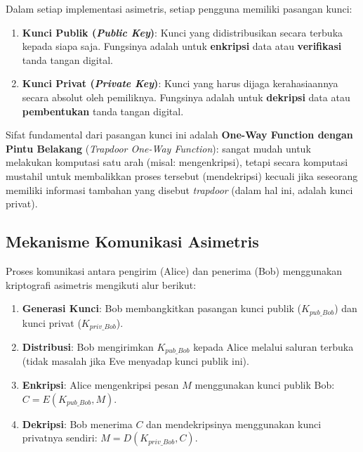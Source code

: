 Dalam setiap implementasi asimetris, setiap pengguna memiliki pasangan kunci:
\begin{enumerate}
    \item \textbf{Kunci Publik (\textit{Public Key})}: Kunci yang didistribusikan secara terbuka kepada siapa saja. Fungsinya adalah untuk \textbf{enkripsi} data atau \textbf{verifikasi} tanda tangan digital.
    \item \textbf{Kunci Privat (\textit{Private Key})}: Kunci yang harus dijaga kerahasiaannya secara absolut oleh pemiliknya. Fungsinya adalah untuk \textbf{dekripsi} data atau \textbf{pembentukan} tanda tangan digital.
\end{enumerate}

Sifat fundamental dari pasangan kunci ini adalah \textbf{One-Way Function dengan Pintu Belakang} (\textit{Trapdoor One-Way Function}): sangat mudah untuk melakukan komputasi satu arah (misal: mengenkripsi), tetapi secara komputasi mustahil untuk membalikkan proses tersebut (mendekripsi) kecuali jika seseorang memiliki informasi tambahan yang disebut \textit{trapdoor} (dalam hal ini, adalah kunci privat).

\subsection{Mekanisme Komunikasi Asimetris}

Proses komunikasi antara pengirim (Alice) dan penerima (Bob) menggunakan kriptografi asimetris mengikuti alur berikut:
\begin{enumerate}
    \item \textbf{Generasi Kunci}: Bob membangkitkan pasangan kunci publik ($K_{pub\_Bob}$) dan kunci privat ($K_{priv\_Bob}$).
    \item \textbf{Distribusi}: Bob mengirimkan $K_{pub\_Bob}$ kepada Alice melalui saluran terbuka (tidak masalah jika Eve menyadap kunci publik ini).
    \item \textbf{Enkripsi}: Alice mengenkripsi pesan $M$ menggunakan kunci publik Bob: $C = E(K_{pub\_Bob}, M)$.
    \item \textbf{Dekripsi}: Bob menerima $C$ dan mendekripsinya menggunakan kunci privatnya sendiri: $M = D(K_{priv\_Bob}, C)$.
\end{enumerate}


